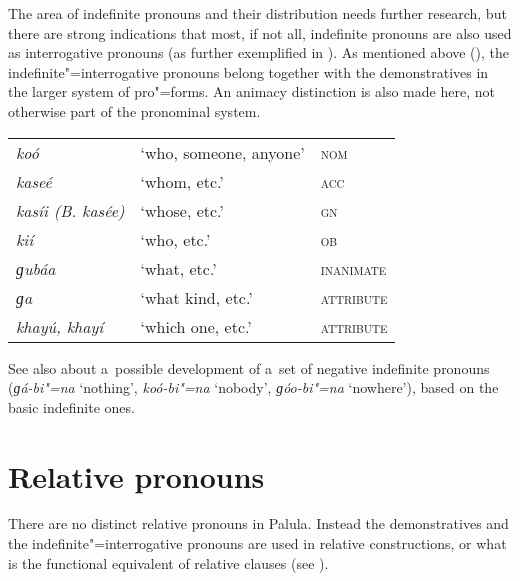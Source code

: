 The area of indefinite pronouns and their distribution needs further research, but there are strong indications that most, if not all, indefinite pronouns are also used as interrogative pronouns (as further exemplified in ). As mentioned above (), the indefinite"=interrogative pronouns belong together with the demonstratives in the larger system of pro"=forms. An animacy distinction is also made here, not otherwise part of the pronominal system.

\begin{table}[H]
\begin{tabularx}{\textwidth}{ l l l }
\textit{koó} &
`who, someone, anyone' &
\textsc{nom} \\
\textit{kaseé} &
`whom, etc.' &
\textsc{acc}\\
\textit{kasíi (B. kasée)} &
`whose, etc.' &
\textsc{gn} \\
\textit{kií} &
`who, etc.' &
\textsc{ob} \\
\textit{ɡubáa} &
`what, etc.' &
\textsc{inanimate} \\
\textit{ɡa} &
`what kind, etc.' &
\textsc{attribute} \\
\textit{khayú, khayí} &
`which one, etc.' &
\textsc{attribute} \\
\end{tabularx}
\end{table}

See also  about a~possible development of a~set of negative indefinite pronouns (\textit{ɡá-bi"=na} `nothing', \textit{koó-bi"=na} `nobody', \textit{ɡóo-bi"=na} `nowhere'), based on the basic indefinite ones.

\section{Relative pronouns}
\label{sec:5-8}


There are no distinct relative pronouns in Palula. Instead the demonstratives and the indefinite"=interrogative pronouns are used in relative constructions, or what is the functional equivalent of relative clauses (see ).